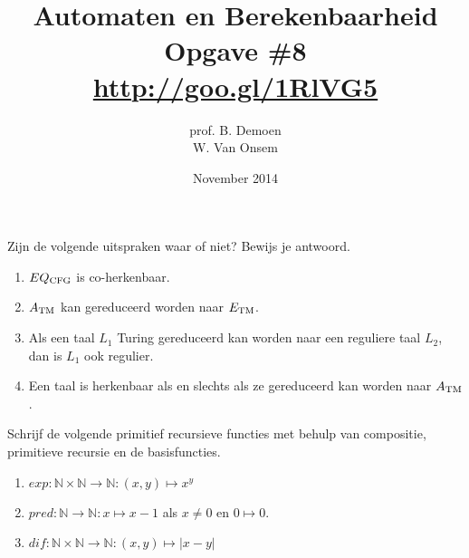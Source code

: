 \documentclass[a4paper]{article}
\title{Automaten en Berekenbaarheid\\Opgave \#8\\\url{http://goo.gl/1RlVG5}}
\author{prof. B. Demoen\\W. Van Onsem}
\date{November 2014}
\newcommand{\N}{\mathbb{N}}
\begin{document}
\maketitle

\begin{question}
Zijn de volgende uitspraken waar of niet? Bewijs je antwoord.
\begin{enumerate}
  \item $EQ_{\rm CFG}$ is co-herkenbaar.
  \item $A_{\rm TM}$ kan gereduceerd worden naar $E_{\rm TM}$.
  \item Als een taal $L_1$ Turing gereduceerd kan worden naar een reguliere taal $L_2$, dan is $L_1$ ook regulier.
  \item Een taal is herkenbaar als en slechts als ze gereduceerd kan worden naar $A_{\rm TM}$.
\end{enumerate}
\end{question}

\begin{question}
Schrijf de volgende primitief recursieve functies met behulp van compositie, primitieve recursie en de basisfuncties.
\begin{enumerate}
  \item $exp : \N \times \N \to \N : (x,y) \mapsto x^y$
  \item $pred : \N \to \N : x \mapsto x - 1$ als $x \neq 0$ en $0 \mapsto 0$.
  \item $dif : \N \times \N \to \N : (x,y) \mapsto | x - y |$
\end{enumerate}
\end{question}
\end{document}
